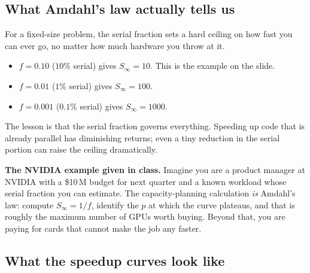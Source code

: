\subsection{What Amdahl's law actually tells us}

For a fixed-size problem, the serial fraction sets a hard ceiling on how
fast you can ever go, no matter how much hardware you throw at it.

\begin{itemize}
  \item $f = 0.10$ ($10\%$ serial) gives $S_\infty = 10$. This is the example on the slide.
  \item $f = 0.01$ ($1\%$ serial) gives $S_\infty = 100$.
  \item $f = 0.001$ ($0.1\%$ serial) gives $S_\infty = 1000$.
\end{itemize}

The lesson is that the serial fraction governs everything. Speeding up
code that is already parallel has diminishing returns; even a tiny
reduction in the serial portion can raise the ceiling dramatically.

\begin{ppkey}
\textbf{The NVIDIA example given in class.}
Imagine you are a product manager at NVIDIA with a \$10\,M budget for next
quarter and a known workload whose serial fraction you can estimate. The
capacity-planning calculation \emph{is} Amdahl's law: compute
$S_\infty = 1/f$, identify the $p$ at which the curve plateaus, and that is
roughly the maximum number of GPUs worth buying. Beyond that, you are
paying for cards that cannot make the job any faster.
\end{ppkey}

\subsection{What the speedup curves look like}

